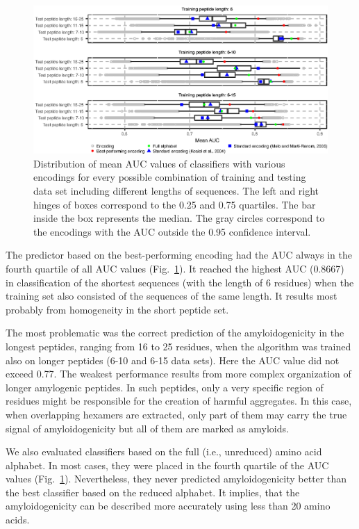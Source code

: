 \documentclass[fleqn,10pt,twoside]{gcb15submission}
\begin{document}
\begin{figure}[h]
\centerline{\includegraphics{figures/AUC_boxplot.eps}}
\caption{Distribution of mean AUC values of classifiers with various encodings 
for every possible combination of training and testing data set including 
different lengths of sequences. The left and right hinges of boxes correspond 
to 
the 0.25 and 0.75 quartiles. The bar inside the box represents the median. The 
gray circles correspond to the encodings with the AUC outside the 0.95 
confidence interval. 
}\label{fig:AUC_boxplot}

\end{figure}

The predictor based on the best-performing encoding had the AUC always in the 
fourth quartile of all AUC values (Fig.~\ref{fig:AUC_boxplot}). It reached the 
highest AUC (0.8667) in classification of the shortest sequences (with the 
length of 6 residues) when the training set also consisted of the sequences of 
the same length. It results most probably from homogeneity in the short peptide 
set. 

  The most problematic was the correct prediction of the amyloidogenicity in the 
longest peptides, ranging from 16 to 25 residues, when the algorithm was trained 
also on longer peptides (6-10 and 6-15 data sets). Here the AUC value did not 
exceed 0.77. The weakest performance results from more complex organization of 
longer amylogenic peptides. In such peptides, only a very specific region of 
residues might be responsible for the creation of harmful aggregates. In this 
case, when overlapping hexamers are extracted, only part of them may carry the 
true signal of amyloidogenicity but all of them are marked as amyloids. 

  We also evaluated classifiers based on the full (i.e., unreduced) amino acid 
alphabet. In most cases, they were placed in the fourth quartile of the AUC 
values (Fig.~\ref{fig:AUC_boxplot}). Nevertheless, they never predicted 
amyloidogenicity better than the best classifier based on the reduced alphabet. 
It implies, that the amyloidogenicity can be described more accurately using less 
than 20 amino acids.
\end{document}
